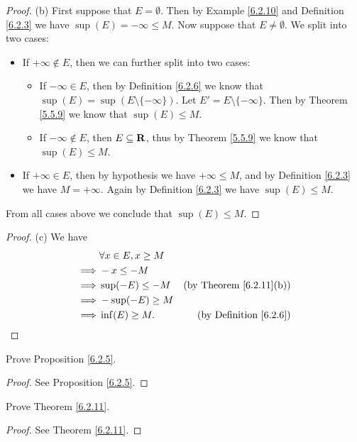 \begin{proof}{(b)}
    First suppose that \(E = \emptyset\).
    Then by Example \ref{6.2.10} and Definition \ref{6.2.3} we have \(\sup(E) = -\infty \leq M\).
    Now suppose that \(E \neq \emptyset\).
    We split into two cases:
    \begin{itemize}
        \item If \(+\infty \not\in E\), then we can further split into two cases:
              \begin{itemize}
                  \item If \(-\infty \in E\), then by Definition \ref{6.2.6} we know that \(\sup(E) = \sup(E \setminus \{-\infty\})\).
                        Let \(E' = E \setminus \{-\infty\}\).
                        Then by Theorem \ref{5.5.9} we know that \(\sup(E) \leq M\).
                  \item If \(-\infty \notin E\), then \(E \subseteq \mathbf{R}\), thus by Theorem \ref{5.5.9} we know that \(\sup(E) \leq M\).
              \end{itemize}
        \item If \(+\infty \in E\), then by hypothesis we have \(+\infty \leq M\), and by Definition \ref{6.2.3} we have \(M = +\infty\).
              Again by Definition \ref{6.2.3} we have \(\sup(E) \leq M\).
    \end{itemize}
    From all cases above we conclude that \(\sup(E) \leq M\).
\end{proof}

\begin{proof}{(c)}
    We have
    \begin{align*}
                 & \forall x \in E, x \geq M                                       \\
        \implies & -x \leq -M                                                      \\
        \implies & \sup(-E) \leq -M          & \text{(by Theorem \ref{6.2.11}(b))} \\
        \implies & -\sup(-E) \geq M                                                \\
        \implies & \inf(E) \geq M.           & \text{(by Definition \ref{6.2.6})}
    \end{align*}
\end{proof}

\exercisesection

\begin{exercise}\label{ex 6.2.1}
    Prove Proposition \ref{6.2.5}.
\end{exercise}

\begin{proof}
    See Proposition \ref{6.2.5}.
\end{proof}

\begin{exercise}\label{ex 6.2.2}
    Prove Theorem \ref{6.2.11}.
\end{exercise}

\begin{proof}
    See Theorem \ref{6.2.11}.
\end{proof}